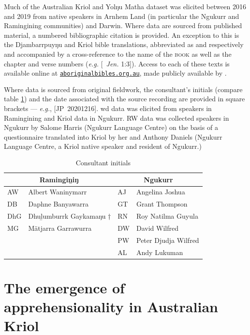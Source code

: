 \documentclass[12pt,dvipsnames]{report}
\begin{document}

Much of the Australian Kriol and Yolŋu Matha dataset was elicited between 2016 and 2019 from native speakers in Arnhem Land (in particular the Ngukurr and Ramingining communities) and Darwin. Where data are sourced from published material, a numbered bibliographic citation is provided. An exception to this is the Djambarrpuyŋu and Kriol bible translations, abbreviated as  and  respectively and accompanied by a cross-reference to the name of the \textsc{book} as well as the chapter and verse numbers (\textit{e.g.} [~\textit{Jen.} 1:3]). Access to each of these texts is available online at \href{https://aboriginalbibles.org.au/}{\tt aboriginalbibles.org.au}, made publicly available by \citeauthor{KB}.

  Where data is sourced from original fieldwork, the consultant's initials  (compare table \ref{tab:consultants}) and the date associated with the source recording are provided in square brackets --- \textit{e.g.}, [JP~20201216]. \acrlong{wd} data was elicited from speakers in Ramingining and Kriol data in Ngukurr. \acrlong{RW} data was collected speakers in Ngukurr by Salome Harris (Ngukurr Language Centre) on the basis of a questionnaire translated into Kriol by her and Anthony Daniels (Ngukurr Language Centre, a Kriol native speaker and resident of Ngukurr.) %
  
  
  
  \begin{table}\caption[List of consultants]{Consultant initials}\label{tab:consultants}
  	\centering	\begin{tabular}{ll|ll}
  		\multicolumn{2}{c}{\textbf{Ramingiṉiŋ}} &	\multicolumn{2}{c}{\textbf{Ngukurr}}\\\midrule
  		AW& Albert Waninymarr	& AJ & Angelina Joshua\\
  		DB & Daphne Banyawarra	& GT & Grant Thompson\\
  		DhG & Dhuḻumburrk Gaykamaŋu † & RN & Roy Natilma Guyula\\
  		MG & Mätjarra Garrawurra& DW & David Wilfred \\
  		&& PW & Peter Djudja Wilfred\\
  		&&AL & Andy Lukuman
  	\end{tabular}
  \end{table}

\part{The emergence of apprehensionality in Australian Kriol}\label{bambai}
 
\end{document}
